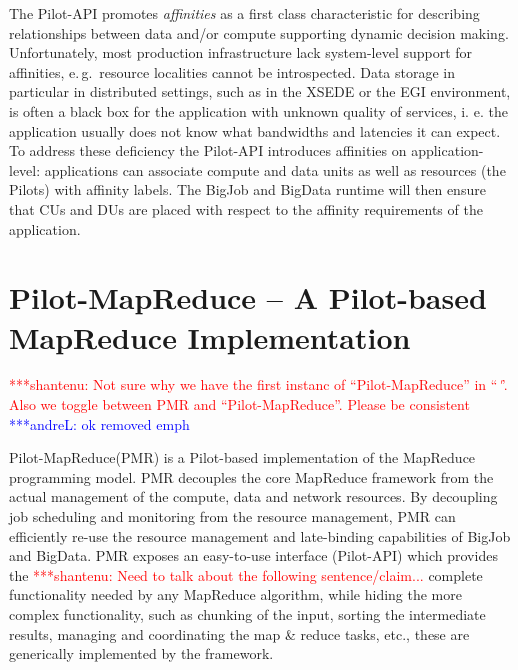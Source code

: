 \documentclass{acm_proc_article-sp}
\newcommand{\jhanote}[1]{ {\textcolor{red} { ***shantenu: #1 }}}
\newcommand{\alnote}[1]{ {\textcolor{blue} { ***andreL: #1 }}}
\newcommand{\alnote}[1]{}
\newcommand{\jhanote}[1]{}
\newcommand{\pilot}{Pilot\xspace}
\newcommand{\pilots}{Pilots\xspace}
\newcommand{\pilotmapreduce}{Pilot-MapReduce\xspace}
\begin{document}
The Pilot-API promotes \emph{affinities} as a first class characteristic for
describing relationships between data and/or compute supporting dynamic decision
making. Unfortunately, most production infrastructure lack system-level support
for affinities, e.\,g.\ resource localities cannot be introspected. Data storage
in particular in distributed settings, such as in the XSEDE or the EGI
environment, is often a black box for the application with unknown quality of
services, i. e. the application usually does not know what bandwidths and
latencies it can expect. To address these deficiency the Pilot-API introduces 
affinities on application-level: applications can associate compute and data 
units as well as resources  (the \pilots) with affinity labels. The BigJob and 
BigData runtime will then ensure that CUs and DUs are placed with respect to the 
affinity requirements of the application.


\section{Pilot-MapReduce -- A Pilot-based MapReduce Implementation}
\label{sec-pilot-mr}

\jhanote{Not sure why we have the first instanc of ``\pilotmapreduce''
  in ``\emph''. Also we toggle between PMR and
  ``\pilotmapreduce''. Please be consistent} \alnote{ok removed emph}
  

\pilotmapreduce (PMR) is a \pilot-based implementation of the
MapReduce programming model. PMR decouples the core MapReduce
framework from the actual management of the compute, data and network
resources. By decoupling job scheduling and monitoring from the
resource management, PMR can efficiently re-use the resource
management and late-binding capabilities of BigJob and BigData. PMR
exposes an easy-to-use interface (Pilot-API) which provides the
\jhanote{Need to talk about the following sentence/claim...} complete
functionality needed by any MapReduce algorithm, while hiding the more
complex functionality, such as chunking of the input, sorting the
intermediate results, managing and coordinating the map \& reduce
tasks, etc., these are generically implemented by the framework.



\end{document}
